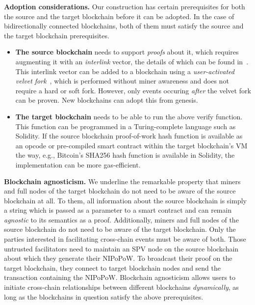 \noindent
\textbf{Adoption considerations. } Our construction has certain prerequisites
for both the source and the target blockchain before it can be adopted. In the
case of bidirectionally connected blockchains, both of them must satisfy the
source and the target blockchain prerequisites.

\begin{itemize}
  \item \textbf{The source blockchain} needs to support \emph{proofs} about it,
        which requires augmenting it with an \emph{interlink} vector, the
        details of which can be found in~\cite{popow}. This interlink vector
        can be added to a blockchain using a \emph{user-activated velvet
        fork}~\cite{nipopows,velvet}, which is performed without miner awareness
        and does not require a hard or soft fork. However, only events occuring
        \emph{after} the velvet fork can be proven. New blockchains can adopt
        this from genesis.
  \item \textbf{The target blockchain} needs to be able to run the above
        \textsf{verify} function. This function can be programmed in a
        Turing-complete language such as Solidity. If the source blockchain
        proof-of-work hash function is available as an opcode or pre-compiled
        smart contract within the target blockchain's VM the way, e.g.,
        Bitcoin's SHA256 hash function is available in Solidity, the
        implementation can be more gas-efficient.
\end{itemize}

\noindent
\textbf{Blockchain agnosticism. }
We underline the remarkable property that miners and full nodes of the target
blockchain do not need to be aware of the source blockchain at all. To them,
all information about the source blockchain is simply a string which is passed
as a parameter to a smart contract and can remain \emph{agnostic} to its
semantics as a proof. Additionally, miners and full nodes of the source
blockchain do not need to be aware of the target blockchain. Only the parties
interested in facilitating cross-chain events must be aware of both. Those
untrusted facilitators need to maintain an SPV node on the source blockchain
about which they generate their NIPoPoW. To broadcast their proof on the target
blockchain, they connect to target blockchain nodes and send the transaction
containing the NIPoPoW. Blockchain agnosticism allows users to initiate
cross-chain relationships between different blockchains \emph{dynamically}, as
long as the blockchains in question satisfy the above prerequisites.

